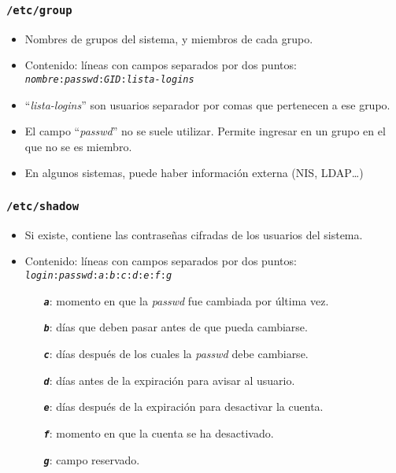 \documentclass[ucs]{beamer}
\begin{document}
\begin{frame}[fragile]
  \frametitle{\texttt{/etc/group}}
  \begin{itemize}
    \item Nombres de grupos del sistema, y miembros de cada grupo.
    \item Contenido: líneas con campos separados por dos puntos:\\
      \texttt{\emph{nombre}:\emph{passwd}:\emph{GID}:\emph{lista-logins}}
    \item ``\emph{lista-logins}'' son usuarios separador por comas que
      pertenecen a ese grupo.
    \item El campo ``\emph{passwd}'' no se suele utilizar. Permite ingresar en un grupo
en el que no se es miembro. 
    \item En algunos sistemas, puede haber información externa (NIS, LDAP\ldots)
  \end{itemize}
\end{frame}

\begin{frame}[fragile]
  \frametitle{\texttt{/etc/shadow}}
  \begin{itemize}
    \item Si existe, contiene las contraseñas cifradas de los usuarios del sistema.
    \item Contenido: líneas con campos separados por dos puntos:\\
      \texttt{\emph{login}:\emph{passwd}:\emph{a}:\emph{b}:\emph{c}:\emph{d}:\emph{e}:\emph{f}:\emph{g}}
      \begin{itemize}
        \item[\texttt{\textbf{\emph{a}}}:] momento en que la \emph{passwd} fue cambiada por última vez.
        \item[\texttt{\textbf{\emph{b}}}:] días que deben pasar antes de que pueda cambiarse.
        \item[\texttt{\textbf{\emph{c}}}:] días después de los cuales la \emph{passwd} debe cambiarse.
        \item[\texttt{\textbf{\emph{d}}}:] días antes de la expiración para avisar al usuario.
        \item[\texttt{\textbf{\emph{e}}}:] días después de la expiración para desactivar la cuenta.
        \item[\texttt{\textbf{\emph{f}}}:] momento en que la cuenta se ha desactivado.
        \item[\texttt{\textbf{\emph{g}}}:] campo reservado.
      \end{itemize}
  \end{itemize}
\end{frame}
\end{document}
